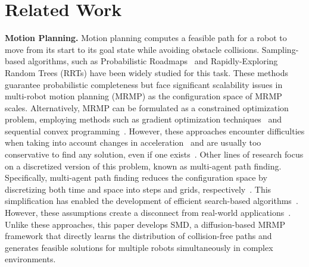 \section{Related Work}
\textbf{Motion Planning.}
Motion planning computes a feasible path for a robot to move from its start to its goal state while avoiding obstacle collisions.
Sampling-based algorithms, such as Probabilistic Roadmaps~\cite{508439} and Rapidly-Exploring Random Trees (RRTs)\cite{lavalle1998rapidly} have been widely studied for this task. These methods guarantee probabilistic completeness but face significant scalability issues in multi-robot motion planning (MRMP) as the configuration space of MRMP scales. 
Alternatively, MRMP can be formulated as a constrained optimization problem, employing methods such as gradient optimization techniques~\cite{ratliff2009chomp} and sequential convex programming~\cite{6385823,7140034}. However, these approaches encounter difficulties when taking into account changes in acceleration~\cite{ichnowski2020deep} and are usually too conservative to find any solution, even if one exists~\cite{7140034}. 
Other lines of research focus on a discretized version of this problem, known as multi-agent path finding. Specifically, multi-agent path finding reduces the configuration space by discretizing both time and space into steps and grids, respectively~\cite{stern2019multi}. This simplification has enabled the development of efficient search-based algorithms~\cite{li2019improved, li2021eecbs,okumura2022priority}. However, these assumptions create a disconnect from real-world applications~\cite{shaoul2024multi}. Unlike these approaches, this paper develops SMD, a diffusion-based MRMP framework that directly learns the distribution of collision-free paths and generates feasible solutions for multiple robots simultaneously in complex environments.

